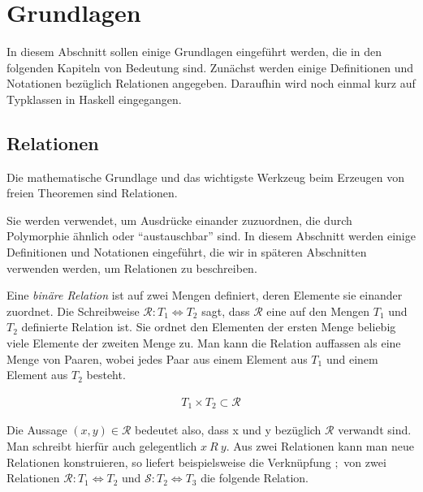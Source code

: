 \section{Grundlagen}

In diesem Abschnitt sollen einige Grundlagen eingeführt werden, die in den folgenden Kapiteln von Bedeutung sind. Zunächst werden
einige Definitionen und Notationen bezüglich Relationen angegeben. Daraufhin wird noch einmal kurz auf Typklassen in Haskell
eingegangen.


\subsection{Relationen}

Die mathematische Grundlage und das wichtigste Werkzeug beim Erzeugen von freien Theoremen sind Relationen.

Sie werden verwendet, um Ausdrücke einander zuzuordnen, die durch Polymorphie ähnlich oder ``austauschbar'' sind.
In diesem Abschnitt werden einige Definitionen und Notationen eingeführt, die wir in späteren Abschnitten verwenden werden,
um Relationen zu beschreiben. 

Eine \textit{binäre Relation} ist auf zwei Mengen definiert, deren Elemente sie einander zuordnet. Die Schreibweise
$\mathcal{R} : T_1 \Leftrightarrow T_2$ sagt, dass $\mathcal{R}$ eine auf den Mengen $T_1$ und $T_2$ definierte
Relation ist. Sie ordnet den Elementen der ersten Menge beliebig viele Elemente der zweiten Menge zu. Man kann die Relation
auffassen als eine Menge von Paaren, wobei jedes Paar aus einem Element aus $T_1$ und einem Element aus $T_2$ besteht.

\begin{align*}
T_1 \times T_2 \subset \mathcal{R}
\end{align*}

Die Aussage $(x, y) \in \mathcal{R}$ bedeutet also, dass x und y bezüglich $\mathcal{R}$ verwandt sind. Man schreibt hierfür
auch gelegentlich $x\ R\ y$. Aus zwei Relationen kann man neue Relationen konstruieren, so liefert beispielsweise die
Verknüpfung  $;$ von zwei Relationen $\mathcal{R} : T_1 \Leftrightarrow T_2$ und
$\mathcal{S} : T_2 \Leftrightarrow T_3$ die folgende Relation.

